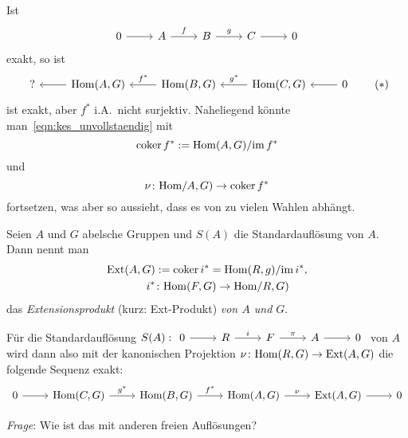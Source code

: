 Ist
\begin{equation*}
  \begin{tikzcd}
    0 \arrow{r}{}
      & A \arrow{r}{f}
      & B \arrow{r}{g}
      & C \arrow{r}{}
      & 0
  \end{tikzcd}
\end{equation*}
exakt, so ist
\begin{equation*}
  \begin{tikzcd}[arrows=leftarrow]
    ? \arrow{r}{}
      & \Hom(A,G) \arrow{r}{f^*}
      & \Hom(B,G) \arrow{r}{g^*}
      & \Hom(C,G) \arrow{r}{}
      & 0
  \end{tikzcd}
  \tag{$*$}\label{eqn:kes_unvollstaendig}
\end{equation*}
ist exakt, aber $f^*$ i.A.\ nicht surjektiv.
Naheliegend könnte man~\eqref{eqn:kes_unvollstaendig} mit
\begin{equation*}
  \operatorname{coker} f^* := \mathrm{Hom}(A,G) / {\operatorname{im} f^*}
\end{equation*}
und
\begin{equation*}
  \nu\colon \mathrm{Hom}/A,G) \to \operatorname{coker} f^*
\end{equation*}
fortsetzen, was aber so aussieht, dass es von zu vielen Wahlen abhängt.
\begin{defn}
  Seien $A$ und $G$ abelsche Gruppen und $S(A)$ die Standardauflösung von $A$.
  Dann nennt man
  \begin{align*}
    \mathrm{Ext}(A,G) &:= \operatorname{coker} i^* = \mathrm{Hom}(R,g) / {\operatorname{im} i^*}, \\
    i^* & \colon \mathrm{Hom}(F,G) \to \mathrm{Hom}/R,G)
  \end{align*}
  das \emph{Extensionsprodukt} (kurz: Ext-Produkt) \emph{von $A$ und $G$}.
\end{defn}
\begin{kommentar}
  Für die Standardauflösung $S(A): \begin{tikzcd} 0 \arrow{r}{} &R\arrow{r}{i} &F\arrow{r}{\pi} &A\arrow{r}{}&0\end{tikzcd}$ von $A$ wird dann also mit der kanonischen Projektion $\nu\colon \mathrm{Hom}(R,G) \to \mathrm{Ext}(A,G)$ die folgende Sequenz exakt:
  \begin{equation*}
    \begin{tikzcd}
      0 \arrow{r}{}
        & \Hom(C,G) \arrow{r}{g^*}
        & \Hom(B,G) \arrow{r}{f^*}
        & \Hom(A,G) \arrow{r}{\nu}
        & \Ext(A,G) \arrow{r}{}
        & 0
    \end{tikzcd}
  \end{equation*}
\end{kommentar}
\emph{Frage}: Wie ist das mit anderen freien Auflösungen?
